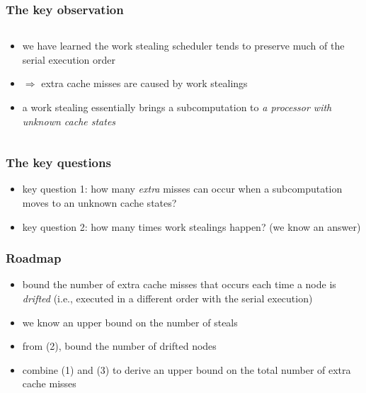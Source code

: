 \documentclass[12pt,dvipdfmx]{beamer}
\newcommand{\ao}[1]{{\color{blue}#1}}
\newcommand{\aka}[1]{{\color{red}#1}}
\begin{document}
\begin{frame}
\frametitle{The key observation}
\begin{columns}
\begin{column}{0.7\textwidth}
\begin{itemize}
\item we have learned the work stealing scheduler 
  tends to preserve much of the serial execution order 

\item $\Rightarrow$ extra cache misses are caused
  by work stealings

\item a work stealing essentially brings a
  subcomputation to \aka{\em a processor with
    unknown cache states}
\end{itemize}
\end{column}

\begin{column}{0.3\textwidth}
\def\svgwidth{\textwidth}
{\footnotesize }
\end{column}
\end{columns}
\end{frame}


\begin{frame}
\frametitle{The key questions}
\begin{itemize}
\item \ao{key question 1:} how many \ao{\em extra}
  misses can occur when a subcomputation moves to
  an unknown cache states?

\begin{center}
\def\svgwidth{0.7\textwidth}
{\scriptsize}
\end{center}

\item \ao{key question 2:} how many times work
  stealings happen? (we know an answer)
\end{itemize}
\end{frame}

\begin{frame}
\frametitle{Roadmap}

\begin{itemize}
\item [(1)] bound the number of extra cache misses that occurs
  each time a node is \ao{\em drifted} 
  (i.e., executed in a different order with the serial execution)

\item [(2)] we know an upper bound on the number of steals
\item [(3)] from (2), bound the number of drifted nodes
\item combine (1) and (3) to derive an upper bound on 
  the total number of extra cache misses
\end{itemize}
\end{frame}
\end{document}
